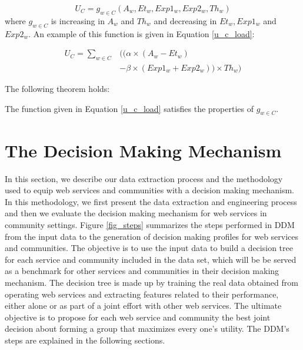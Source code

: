 \begin{equation}\label{improved_u_c_general}
U_{C} = g_{w\in C}(A_{w}, Et_{w}, Exp1_{w}, Exp2_{w}, Th_{w})
\end{equation}
%
where $g_{w\in C}$ is increasing in $A_{w}$ and $Th_{w}$ and decreasing in $Et_{w}, Exp1_{w}$ and $Exp2_{w}$. An example of this function is given in Equation \ref{u_c_load}:


\begin{equation}\label{u_c_load}
\begin{split}
U_{C} = \sum_{w \in C}&\bigg(\big(\alpha \times (A_{w} - Et_{w}) \\
        & - \beta \times (Exp1_{w} + Exp2_{w})\big) \times Th_{w}\bigg)
\end{split}
\end{equation}

The following theorem holds:

\begin{theorem}
The function given in Equation \ref{u_c_load} satisfies the properties of $g_{w\in C}$.
\end{theorem}


\section{The Decision Making Mechanism}\label{s:model}

In this section, we describe our data extraction process and the methodology used to equip web services and communities with a decision making mechanism. In this methodology, we first present the data extraction and engineering process and then we evaluate the decision making mechanism for web services in community settings. Figure \ref{fig_steps} summarizes the steps performed in DDM from the input data to the generation of decision making profiles for web services and communities. The objective is to use the input data to build a decision tree for each service and community included in the data set, which will be be served as a benchmark for other services and communities in their decision making mechanism. The decision tree is made up by training the real data obtained from operating web services and extracting features related to their performance, either alone or as part of a joint effort with other web services. The ultimate objective is to propose for each web service and community the best joint decision about forming a group that maximizes every one's utility. The DDM's steps are explained in the following sections.

